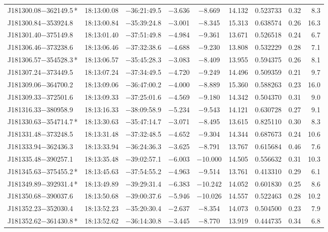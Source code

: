 \begin{table*}
\begin{tabular}{lcccccccr}
J181300.08$-$362149.5\,* & 18:13:00.08 & $-$36:21:49.5 & $-$3.636 & $-$8.669 & 14.132 & 0.523733 & 0.32 & 8.3 \\
J181300.84$-$353924.8 & 18:13:00.84 & $-$35:39:24.8 & $-$3.001 & $-$8.345 & 15.313 & 0.638574 & 0.26 & 16.3 \\
J181301.40$-$375149.8 & 18:13:01.40 & $-$37:51:49.8 & $-$4.984 & $-$9.361 & 13.671 & 0.526518 & 0.24 & 6.7 \\
J181306.46$-$373238.6 & 18:13:06.46 & $-$37:32:38.6 & $-$4.688 & $-$9.230 & 13.808 & 0.532229 & 0.28 & 7.1 \\
J181306.57$-$354528.3\,* & 18:13:06.57 & $-$35:45:28.3 & $-$3.083 & $-$8.409 & 13.955 & 0.594375 & 0.26 & 8.1 \\
J181307.24$-$373449.5 & 18:13:07.24 & $-$37:34:49.5 & $-$4.720 & $-$9.249 & 14.496 & 0.509359 & 0.21 & 9.7 \\
J181309.06$-$364700.2 & 18:13:09.06 & $-$36:47:00.2 & $-$4.000 & $-$8.889 & 15.360 & 0.588263 & 0.23 & 16.0 \\
J181309.33$-$372501.6 & 18:13:09.33 & $-$37:25:01.6 & $-$4.569 & $-$9.180 & 14.342 & 0.504370 & 0.31 & 9.0 \\
J181316.33$-$380958.9 & 18:13:16.33 & $-$38:09:58.9 & $-$5.234 & $-$9.543 & 14.121 & 0.630728 & 0.27 & 9.1 \\
J181330.63$-$354714.7\,* & 18:13:30.63 & $-$35:47:14.7 & $-$3.071 & $-$8.495 & 13.615 & 0.825110 & 0.30 & 8.3 \\
J181331.48$-$373248.5 & 18:13:31.48 & $-$37:32:48.5 & $-$4.652 & $-$9.304 & 14.344 & 0.687673 & 0.24 & 10.6 \\
J181333.94$-$362436.3 & 18:13:33.94 & $-$36:24:36.3 & $-$3.625 & $-$8.791 & 13.767 & 0.615684 & 0.46 & 7.6 \\
J181335.48$-$390257.1 & 18:13:35.48 & $-$39:02:57.1 & $-$6.003 & $-$10.000 & 14.505 & 0.556632 & 0.31 & 10.3 \\
J181345.63$-$375455.2\,* & 18:13:45.63 & $-$37:54:55.2 & $-$4.963 & $-$9.514 & 13.761 & 0.413310 & 0.29 & 6.1 \\
J181349.89$-$392931.4\,* & 18:13:49.89 & $-$39:29:31.4 & $-$6.383 & $-$10.242 & 14.052 & 0.601830 & 0.25 & 8.6 \\
J181350.68$-$390037.6 & 18:13:50.68 & $-$39:00:37.6 & $-$5.946 & $-$10.026 & 14.557 & 0.522463 & 0.28 & 10.2 \\
J181352.23$-$352030.4 & 18:13:52.23 & $-$35:20:30.4 & $-$2.637 & $-$8.354 & 14.073 & 0.504500 & 0.23 & 7.9 \\
J181352.62$-$361430.8\,* & 18:13:52.62 & $-$36:14:30.8 & $-$3.445 & $-$8.770 & 13.919 & 0.444735 & 0.34 & 6.8 \\

\end{tabular}
\end{table*}
